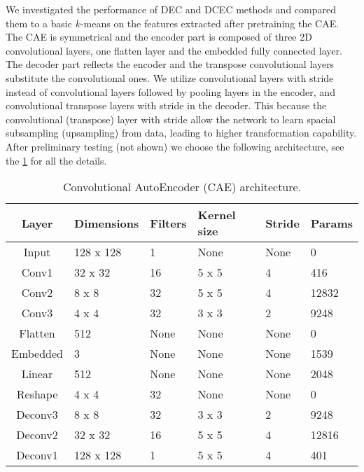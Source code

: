 We investigated the performance of DEC and DCEC methods and compared them to a basic $k$-means on the features extracted after pretraining the CAE. 
The CAE is symmetrical and the encoder part is composed of three 2D convolutional layers, one flatten layer and the embedded fully connected layer. The decoder part reflects the encoder and the transpose convolutional layers substitute the convolutional ones.
We utilize convolutional layers with stride instead of convolutional layers followed by pooling layers in the encoder, and convolutional transpose layers with stride in the decoder. This because the convolutional (transpose) layer with stride allow the network to learn spacial subsampling (upsampling) from data, leading to higher transformation capability.
After preliminary testing (not shown) we choose the following architecture, see the \ref{table_CAE} for all the details.

\begin{table}[H]
    \centering
    \begin{tabular}{clllll} \hline
        \textbf{Layer} & \textbf{Dimensions} & \textbf{Filters} & \textbf{Kernel size} & \textbf{Stride} &\textbf{Params} \\ \hline
        Input    & 128 x 128  & 1       & None        & None   & 0                \\ \hline
        Conv1    & 32 x 32    & 16      & 5 x 5       & 4      & 416              \\ \hline
        Conv2    & 8 x 8      & 32      & 5 x 5       & 4      & 12832            \\ \hline
        Conv3    & 4 x 4      & 32      & 3 x 3       & 2      & 9248             \\ \hline
        Flatten  & 512        & None    & None        & None   & 0                \\ \hline
        Embedded & 3          & None    & None        & None   & 1539             \\ \hline
        Linear   & 512        & None    & None        & None   & 2048             \\ \hline
        Reshape  & 4 x 4      & 32      & None        & None   & 0                \\ \hline
        Deconv3  & 8 x 8      & 32      & 3 x 3       & 2      & 9248             \\ \hline
        Deconv2  & 32 x 32    & 16      & 5 x 5       & 4      & 12816            \\ \hline
        Deconv1  & 128 x 128  & 1       & 5 x 5       & 4      & 401              \\ \hline
    \end{tabular}
    \label{table_CAE}
    \caption{Convolutional AutoEncoder (CAE) architecture.}
\end{table}

